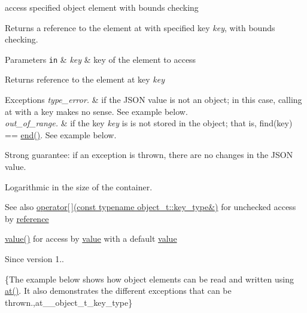 access specified object element with bounds checking 

Returns a reference to the element at with specified key {\itshape key}, with bounds checking.


\begin{DoxyParams}[1]{Parameters}
\mbox{\tt in}  & {\em key} & key of the element to access\\
\hline
\end{DoxyParams}
\begin{DoxyReturn}{Returns}
reference to the element at key {\itshape key} 
\end{DoxyReturn}

\begin{DoxyExceptions}{Exceptions}
{\em type\+\_\+error.} & if the J\+S\+ON value is not an object; in this case, calling {\ttfamily at} with a key makes no sense. See example below. \\
\hline
{\em out\+\_\+of\+\_\+range.} & if the key {\itshape key} is is not stored in the object; that is, {\ttfamily find(key) == \hyperlink{classnlohmann_1_1basic__json_a13e032a02a7fd8a93fdddc2fcbc4763c}{end()}}. See example below.\\
\hline
\end{DoxyExceptions}
Strong guarantee\+: if an exception is thrown, there are no changes in the J\+S\+ON value.

Logarithmic in the size of the container.

\begin{DoxySeeAlso}{See also}
\hyperlink{classnlohmann_1_1basic__json_a233b02b0839ef798942dd46157cc0fe6}{operator\mbox{[}$\,$\mbox{]}(const typename object\+\_\+t\+::key\+\_\+type\&)} for unchecked access by \hyperlink{classnlohmann_1_1basic__json_ac6a5eddd156c776ac75ff54cfe54a5bc}{reference} 

\hyperlink{classnlohmann_1_1basic__json_a404017aa52714a0a4bc79d5af7e4ad2b}{value()} for access by \hyperlink{classnlohmann_1_1basic__json_a404017aa52714a0a4bc79d5af7e4ad2b}{value} with a default \hyperlink{classnlohmann_1_1basic__json_a404017aa52714a0a4bc79d5af7e4ad2b}{value}
\end{DoxySeeAlso}
\begin{DoxySince}{Since}
version 1..
\end{DoxySince}
\{The example below shows how object elements can be read and written using {\ttfamily \hyperlink{classnlohmann_1_1basic__json_a73ae333487310e3302135189ce8ff5d8}{at()}}. It also demonstrates the different exceptions that can be thrown.,at\+\_\+\+\_\+object\+\_\+t\+\_\+key\+\_\+type\} 
